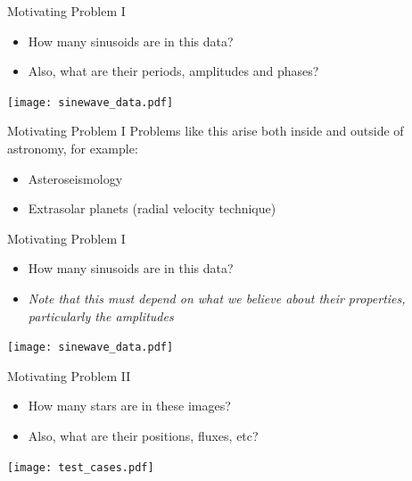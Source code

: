 
\begin{frame}[t,plain]
\titlepage
\end{frame}

\begin{frame}[t]{Motivating Problem I}
\begin{itemize}
\item How many sinusoids are in this data?
\item Also, what are their periods, amplitudes and phases?
\end{itemize}
\begin{center}
\texttt{[image: sinewave\_data.pdf]}
\end{center}
\end{frame}

\begin{frame}[t]{Motivating Problem I}
Problems like this arise both inside and outside of astronomy,
for example:
\vspace{20pt}
\begin{itemize}
\item Asteroseismology
\item Extrasolar planets (radial velocity technique)
\end{itemize}
\end{frame}

\begin{frame}[t]{Motivating Problem I}
\begin{itemize}
\item How many sinusoids are in this data?
\item {\it Note that this must depend on what we believe about their properties,
particularly the amplitudes}
\end{itemize}
\begin{center}
\texttt{[image: sinewave\_data.pdf]}
\end{center}
\end{frame}

\begin{frame}[t]{Motivating Problem II}
\begin{itemize}
\item How many stars are in these images?
\item Also, what are their positions, fluxes, etc?
\end{itemize}
\begin{center}
\texttt{[image: test\_cases.pdf]}
\end{center}
\end{frame}

